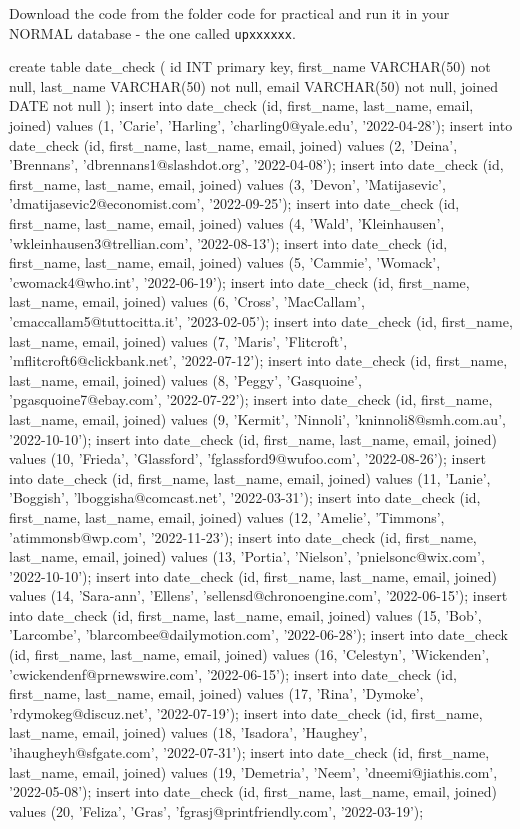 Download the code from the folder code for practical  and run it in your NORMAL database - the one called \verb|upxxxxxx|.
\begin{sql}
create table date_check (
	id INT primary key,
	first_name VARCHAR(50) not null,
	last_name VARCHAR(50) not null,
	email VARCHAR(50) not null,
	joined DATE not null
);
insert into date_check (id, first_name, last_name, email, joined) values (1, 'Carie', 'Harling', 'charling0@yale.edu', '2022-04-28');
insert into date_check (id, first_name, last_name, email, joined) values (2, 'Deina', 'Brennans', 'dbrennans1@slashdot.org', '2022-04-08');
insert into date_check (id, first_name, last_name, email, joined) values (3, 'Devon', 'Matijasevic', 'dmatijasevic2@economist.com', '2022-09-25');
insert into date_check (id, first_name, last_name, email, joined) values (4, 'Wald', 'Kleinhausen', 'wkleinhausen3@trellian.com', '2022-08-13');
insert into date_check (id, first_name, last_name, email, joined) values (5, 'Cammie', 'Womack', 'cwomack4@who.int', '2022-06-19');
insert into date_check (id, first_name, last_name, email, joined) values (6, 'Cross', 'MacCallam', 'cmaccallam5@tuttocitta.it', '2023-02-05');
insert into date_check (id, first_name, last_name, email, joined) values (7, 'Maris', 'Flitcroft', 'mflitcroft6@clickbank.net', '2022-07-12');
insert into date_check (id, first_name, last_name, email, joined) values (8, 'Peggy', 'Gasquoine', 'pgasquoine7@ebay.com', '2022-07-22');
insert into date_check (id, first_name, last_name, email, joined) values (9, 'Kermit', 'Ninnoli', 'kninnoli8@smh.com.au', '2022-10-10');
insert into date_check (id, first_name, last_name, email, joined) values (10, 'Frieda', 'Glassford', 'fglassford9@wufoo.com', '2022-08-26');
insert into date_check (id, first_name, last_name, email, joined) values (11, 'Lanie', 'Boggish', 'lboggisha@comcast.net', '2022-03-31');
insert into date_check (id, first_name, last_name, email, joined) values (12, 'Amelie', 'Timmons', 'atimmonsb@wp.com', '2022-11-23');
insert into date_check (id, first_name, last_name, email, joined) values (13, 'Portia', 'Nielson', 'pnielsonc@wix.com', '2022-10-10');
insert into date_check (id, first_name, last_name, email, joined) values (14, 'Sara-ann', 'Ellens', 'sellensd@chronoengine.com', '2022-06-15');
insert into date_check (id, first_name, last_name, email, joined) values (15, 'Bob', 'Larcombe', 'blarcombee@dailymotion.com', '2022-06-28');
insert into date_check (id, first_name, last_name, email, joined) values (16, 'Celestyn', 'Wickenden', 'cwickendenf@prnewswire.com', '2022-06-15');
insert into date_check (id, first_name, last_name, email, joined) values (17, 'Rina', 'Dymoke', 'rdymokeg@discuz.net', '2022-07-19');
insert into date_check (id, first_name, last_name, email, joined) values (18, 'Isadora', 'Haughey', 'ihaugheyh@sfgate.com', '2022-07-31');
insert into date_check (id, first_name, last_name, email, joined) values (19, 'Demetria', 'Neem', 'dneemi@jiathis.com', '2022-05-08');
insert into date_check (id, first_name, last_name, email, joined) values (20, 'Feliza', 'Gras', 'fgrasj@printfriendly.com', '2022-03-19');

\end{sql}

